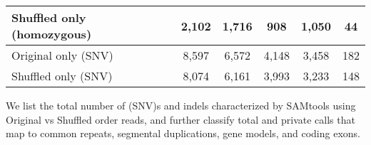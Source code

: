 \begin{table}[htb]
\begin{center}
\begin{tabular}{|l|c||c|c|c|c|}
\hline
Shuffled only (homozygous) & 2,102 & 1,716 & 908 & 1,050 & 44 \\
\hline
Original only (SNV) & 8,597 & 6,572 & 4,148 & 3,458 & 182 \\
\hline
Shuffled only (SNV) & 8,074 & 6,161 & 3,993 & 3,233 & 148 \\ 
\hline
\end{tabular}
\end{center}
{\footnotesize We list the total number of (SNV)s and indels characterized by SAMtools using Original vs Shuffled order reads, 
and further classify total and private calls that map to common repeats, segmental duplications, gene models, and coding exons.}
\label{supptab:orig-vs-shuf-samtools}
\end{table}

\clearpage

